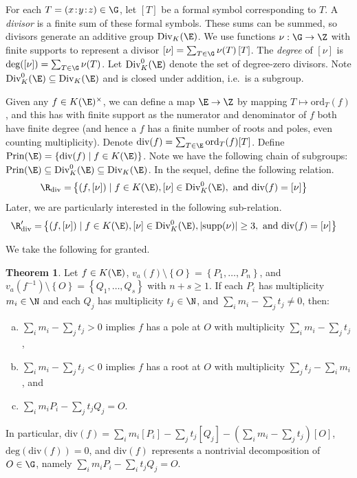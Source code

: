 \documentclass[11pt,letterpaper]{article}
\theoremstyle{definition}
\newtheorem{theorem}{Theorem}[subsection]
\newcommand{\6}{\mathbf}
\newcommand{\7}{\mathcal}
\begin{document}
For each $T = (x\!:\!y\!:\!z) \in \G$, let $\left[T\right]$ be a formal symbol corresponding to $T$. A \textit{divisor} is a finite sum of these formal symbols. These sums can be summed, so divisors generate an additive group $\text{Div}_K(\E)$. We use functions $\nu: \G \to \Z$ with finite supports to represent a divisor $[\nu] = \sum_{T \in \G} \nu(T) \left[T\right]$. The \textit{degree} of $\left[\nu\right]$ is $\text{deg}(\left[\nu\right])=\sum_{T \in \G} \nu(T)$. 
Let $\text{Div}_{K}^0(\E)$ denote the set of degree-zero divisors. Note $\text{Div}_{K}^0(\E) \subseteq \text{Div}_K(\E)$ and is closed under addition, i.e.\ is a subgroup.

Given any $f \in K(\E)^\times$, we can define a map $\E \to \Z$  by mapping $T \mapsto \text{ord}_T(f)$, and this has with finite support as the numerator and denominator of $f$ both have finite degree (and hence a $f$ has a finite number of roots and poles, even counting multiplicity). Denote $\text{div}(f) = \sum_{T \in \E} \text{ord}_T(f)[T]$.  Define $\text{Prin}(\E) = \left\{\text{div}(f) \mid f \in K(\E)\right\}$. Note we have the following chain of subgroups: $\text{Prin}(\E) \subseteq \text{Div}_K^0(\E) \subseteq \text{Div}_K(\E)$. In the sequel, define the following relation.
\begin{align}
\R_{\text{div}} =& \left\{(f, [\nu]) \mid f \in K(\E), [\nu] \in \text{Div}_K^0(\E),  \text{ and } \text{div}(f) = [\nu]\right\} 
\end{align}
Later, we are particularly interested in the following sub-relation.
\begin{align}
\R_{\text{div}}^\prime =& \left\{(f, [\nu]) \mid f \in K(\E), [\nu] \in \text{Div}_K^0(\E),  \left|\text{supp}(\nu)\right| \geq 3, \text{ and } \text{div}(f) = [\nu]\right\} \label{theRelation}
\end{align}

We take the following for granted.
\begin{theorem}
Let $f \in K(\E)$, $v_a(f) \setminus \left\{O\right\} = \left\{P_1, \ldots, P_n\right\}$, and $v_a(f^{-1}) \setminus \left\{O\right\} = \left\{Q_1, \ldots, Q_s\right\}$ with $n + s \geq 1$. If each $P_i$ has multiplicity $m_i  \in \N$ and each $Q_j$ has multiplicity $t_j \in \N$, and $\sum_i m_i - \sum_j t_j \neq 0$, then:
\begin{enumerate}[(a)]
\item $\sum_i m_i - \sum_j t_j > 0$ implies $f$ has a pole at $O$ with multiplicity $\sum_i m_i - \sum_j t_j$, 
\item $\sum_i m_i - \sum_j t_j < 0$ implies $f$ has a root at $O$ with multiplicity $\sum_j t_j - \sum_i m_i$, and
\item $\sum_i m_i P_i - \sum_j t_j Q_j = O$.
\end{enumerate}
In particular, $\text{div}(f) = \sum_i m_i [P_i] - \sum_j t_j [Q_j] - (\sum_i m_i - \sum_j t_j)[O]$, $\text{deg}(\text{div}(f)) = 0$, and $\text{div}(f)$ represents a nontrivial decomposition of $O \in \G$, namely $\sum_i m_i P_i - \sum_i t_j Q_j = O$.
\end{theorem}
\end{document}
